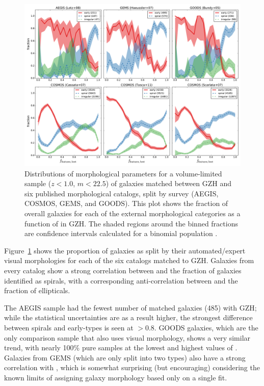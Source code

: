 \documentclass[twocolumn]{aastex6}
\begin{document}
\begin{figure}
\center
\includegraphics[width=1.0\textwidth]{figures/comparisons_features.pdf}
\caption{Distributions of morphological parameters for a volume-limited sample
($z<1.0$, $m<22.5$) of galaxies matched between GZH and six published
morphological catalogs, split by survey (AEGIS, COSMOS, GEMS, and GOODS). This
plot shows the fraction of overall galaxies for each of the external
morphological categories as a function of \fbest{} in GZH. The shaded regions
around the binned fractions are confidence intervals calculated for a binomial
population \citep{cam11}.}
\label{fig:comparisons_features}
\end{figure}

Figure~\ref{fig:comparisons_features} shows the proportion of galaxies as split
by their automated/expert visual morphologies for each of the six catalogs
matched to GZH. Galaxies from every catalog show a strong correlation between
\fbest{} and the fraction of galaxies identified as spirals, with a
corresponding anti-correlation between \fbest{} and the fraction of
ellipticals.

The AEGIS sample had the fewest number of matched galaxies (485) with GZH;
while the statistical uncertainties are as a result higher, the strongest
difference between spirals and early-types is seen at \fbest$>0.8$. GOODS
galaxies, which are the only comparison sample that also uses visual
morphology, shows a very similar trend, with nearly 100\% pure samples at
the lowest and highest values of \fbest.  Galaxies from GEMS (which are
only split into two types) also have a strong correlation with \fbest,
which is somewhat surprising (but encouraging) considering the known limits
of assigning galaxy morphology based only on a single \sersic{} fit. 
\end{document}
